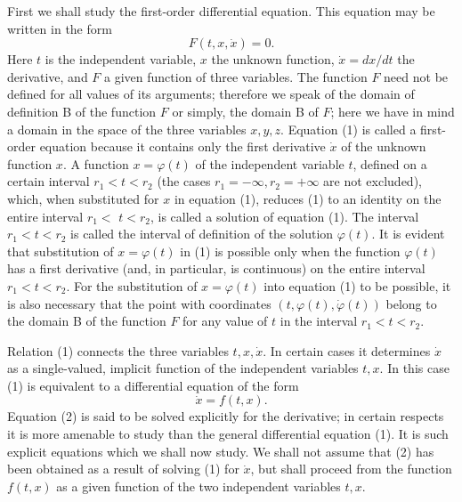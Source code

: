 \documentclass[10pt,a5paper]{book}
\theoremstyle{plain}
\theoremstyle{definition}
\theoremstyle{remark}
\begin{document}
First we shall study the first-order differential equation. This equation may be written in the form
\begin{equation*}
F(t, x, \dot{x})=0 . \tag{1}
\end{equation*}
Here $t$ is the independent variable, $x$ the unknown function, $\dot{x}=d x / d t$ the derivative, and $F$ a given function of three variables. The function $F$ need not be defined for all values of its arguments; therefore we speak of
the domain of definition B of the function $F$ or simply, the domain B of $F$; here we have in mind a domain in the space of the three variables $x, y, z$. Equation (1) is called a first-order equation because it contains only the first derivative $\dot{x}$ of the unknown function $x$. A function $x=\varphi(t)$ of the independent variable $t$, defined on a certain interval $r_{1}<t<r_{2}$ (the cases $r_{1}=-\infty, r_{2}=+\infty$ are not excluded), which, when substituted for $x$ in equation (1), reduces (1) to an identity on the entire interval $r_{1}<$ $t<r_{2}$, is called a solution of equation (1). The interval $r_{1}<t<r_{2}$ is called the interval of definition of the solution $\varphi(t)$. It is evident that substitution of $x=\varphi(t)$ in (1) is possible only when the function $\varphi(t)$ has a first derivative (and, in particular, is continuous) on the entire interval $r_{1}<t<r_{2}$. For the substitution of $x=\varphi(t)$ into equation (1) to be possible, it is also necessary that the point with coordinates $(t, \varphi(t), \dot{\varphi}(t))$ belong to the domain B of the function $F$ for any value of $t$ in the interval $r_{1}<t<r_{2}$.

Relation (1) connects the three variables $t, x, \dot{x}$. In certain cases it determines $\dot{x}$ as a single-valued, implicit function of the independent variables $t, x$. In this case (1) is equivalent to a differential equation of the form
\begin{equation*}
\dot{x}=f(t, x) . \tag{2}
\end{equation*}
Equation (2) is said to be solved explicitly for the derivative; in certain respects it is more amenable to study than the general differential equation (1). It is such explicit equations which we shall now study. We shall not assume that (2) has been obtained as a result of solving (1) for $\dot{x}$, but shall proceed from the function $f(t, x)$ as a given function of the two independent variables $t, x$.
\end{document}
